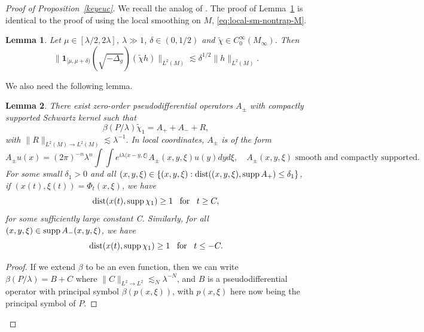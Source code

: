 \documentclass[11pt]{amsart}
\newcommand{\la}{\lambda}
\newtheorem{lemma}{Lemma}[section]
\begin{document}
\begin{proof}[Proof of Proposition~\ref{keyeuc}]
We recall the analog of \cite[Lemma 2.9]{HSTZ}. The proof of Lemma~\ref{loc} is identical to the proof of \cite[Lemma 2.9]{HSTZ} using the local smoothing on $M$, \eqref{eq:local-sm-nontrap-M}.
\begin{lemma}\label{loc}  {Let} $\mu\in [\la/2,2\la]$, $\la\gg1$, $\delta\in (0,1/2)$ and $\tilde \chi\in C^\infty_0(M_\infty)$. {Then}
\begin{equation}\label{3.19}
\| \mathbf{1}_{[\mu,\mu+\delta)}(\sqrt{-\Delta_g}) (\tilde \chi h)\|_{L^2( M)}\lesssim \delta^{1/2}\|h\|_{L^2( M)}.
\end{equation}
\end{lemma}
We also need the following lemma.
\begin{lemma}
    There exist zero-order pseudodifferential operators $A_\pm$ {with compactly supported Schwartz kernel} such that 
{
\begin{equation}\label{eq:lem2.8}
\beta(P/\la)\tilde\chi_1=A_++ A_-+R,
\end{equation} 
}with
$ \|R\|_{L^2(M)\to L^2(M)}\lesssim\la^{-1}.
$
{In local coordinates, $A_{\pm}$ is of the form
\begin{equation}
    A_{\pm} u(x) = (2\pi)^{-n}\la^n\int\int e^{i\la\langle x-y,\xi \rangle} A_{\pm}(x,y,\xi)u(y) dyd\xi,\quad A_{\pm}(x,y,\xi)\text{ smooth and compactly supported}.
\end{equation}
}
For some small $\delta_1>0$ and all $(x,y,\xi)\in \{(x,y,\xi):\textnormal{dist}((x,y,\xi),\textnormal{supp}\,A_+)\leq\delta_1\}$, if $(x(t),\xi(t))=\Phi_t(x,\xi)$, we have 
\begin{equation}\label{6a}
   \textnormal{dist}( x(t), \textnormal{supp}\,\chi_1)\ge 1  \,\,\,\text{ for }\,\,\,t \ge C,
\end{equation}
for some sufficiently large constant C. Similarly, for all $(x, y,\xi)\in \textnormal{supp}\, A_-(x,y,\xi)$,  we have 
\begin{equation}\label{7a}
   \textnormal{dist}( x(t), \textnormal{supp}\,\chi_1)\ge 1 \,\,\,\text{ for }\,\,\,t\le -C.
\end{equation}
\end{lemma}
\begin{proof}
If we extend $\beta$ to be an even function, then we can write $\beta(P/\la)=B+C$ where $ \|C\|_{L^2\to L^2}\lesssim_N \la^{-N}$, and $B$ is a pseudodifferential operator with principal symbol $\beta(p(x,\xi))$,
with $p(x,\xi)$ here now being the principal symbol of $P$. 


\end{proof}
\end{proof}
\end{document}
